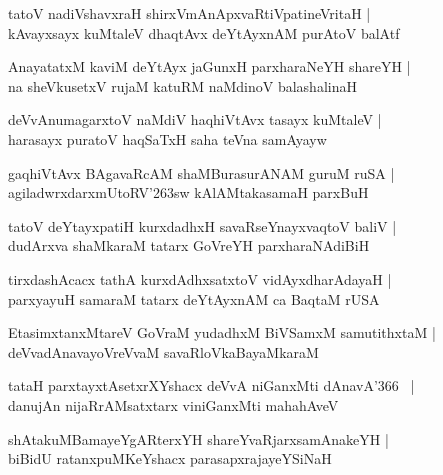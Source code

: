 \documentclass[twoside,12pt,openright]{book}
\def\S{\char'263}
\newcounter{shloka}[chapter]
\begin{document}
\begin{shloka}%
tatoV nadiVshavxraH shirxVmAnApxvaRtiVpatineVritaH |\\
kAvayxsayx kuMtaleV dhaqtAvx deYtAyxnAM purAtoV balAtf
\end{shloka}

\begin{shloka}%
AnayatatxM kaviM deYtAyx jaGunxH parxharaNeYH shareYH |\\
na sheVkusetxV rujaM katuRM naMdinoV balashalinaH 
\end{shloka}

\begin{shloka}%
deVvAnumagarxtoV naMdiV haqhiVtAvx tasayx kuMtaleV |\\
harasayx puratoV haqSaTxH saha teVna samAyayw 
\end{shloka}

\begin{shloka}%
gaqhiVtAvx BAgavaRcAM shaMBurasurANAM guruM ruSA |\\
agiladwrxdarxmUtoRV\S sw kAlAMtakasamaH parxBuH 
\end{shloka}

\begin{shloka}%
tatoV deYtayxpatiH kurxdadhxH savaRseYnayxvaqtoV baliV |\\
dudArxva shaMkaraM tatarx GoVreYH parxharaNAdiBiH 
\end{shloka}

\begin{shloka}%
tirxdashAcacx tathA kurxdAdhxsatxtoV vidAyxdharAdayaH |\\
parxyayuH samaraM tatarx deYtAyxnAM ca BaqtaM rUSA 
\end{shloka}

\begin{shloka}%
EtasimxtanxMtareV GoVraM yudadhxM BiVSamxM samutithxtaM |\\
deVvadAnavayoVreVvaM savaRloVkaBayaMkaraM 
\end{shloka}

\begin{shloka}%
tataH parxtayxtAsetxrXYshacx deVvA niGanxMti dAnavA\char'366 ~|\\
danujAn nijaRrAMsatxtarx viniGanxMti mahahAveV 
\end{shloka}

\begin{shloka}%
shAtakuMBamayeYgARterxYH shareYvaRjarxsamAnakeYH |\\
biBidU ratanxpuMKeYshacx parasapxrajayeYSiNaH 
\end{shloka}
\end{document}
